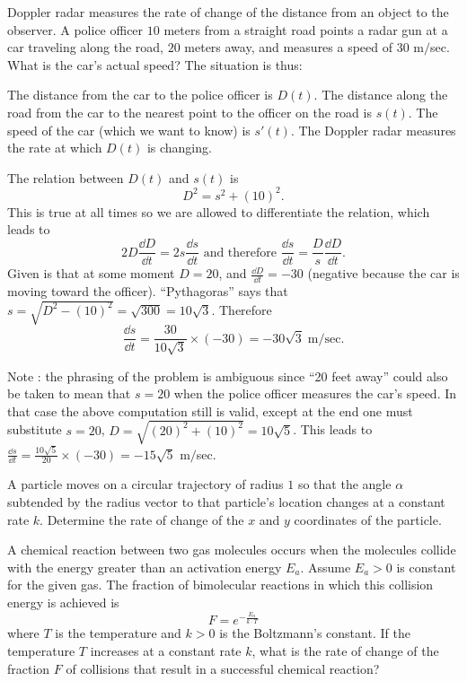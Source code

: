 \begin{multicols}{2}
\problem Doppler radar measures the rate of change of the distance from an
object to the observer. A police officer $10$ meters from a straight road points
a radar gun at a car traveling along the road, $20$ meters away, and measures a
speed of $30$ m$/$sec. What is the car's actual speed?
\answer
The situation is thus:
\begin{center}
  
\end{center}
The distance from the car to the police officer is $D(t)$.
The distance along the road from the car to the nearest point to the officer
on the road is $s(t)$.  The speed of the car (which we want to know) is $s'(t)$.
The Doppler radar measures the rate at which $D(t)$ is changing.

The relation between $D(t)$ and $s(t)$ is
\[
D^2 = s^2 + (10)^2.
\]
This is true at all times so we are allowed to differentiate the relation,
which leads to
\[
2D \frac{\dd D} {\dd t} = 2s\frac{\dd s} {\dd t}
\text{ and therefore }
\frac{\dd s} {\dd t} = \frac{D} {s} \frac{\dd D} {\dd t}.
\]
Given is that at some moment $D=20$, and $\frac{\dd D} {\dd t} = -30$
(negative because the car is moving toward the officer).
``Pythagoras'' says that $s = \sqrt{D^2-(10)^2} = \sqrt{300} = 10\surd 3$.
Therefore
\[
\frac{\dd s} {\dd t} = \frac{30} {10\surd 3} \times(-30) =
-30\surd 3\; \mathrm{m}/\mathrm{sec}.
\]

Note : the phrasing of the problem is ambiguous since ``20 feet away'' could
also be taken to mean that $s=20$ when the police officer measures the car's
speed. In that case the above computation still is valid, except at the end
one must substitute $s=20$, $D = \sqrt{(20)^2 + (10)^2} = 10\surd 5$.
This leads to
$\frac{\dd s} {\dd t} = \frac{10\surd 5} {20}\times(-30) = -15\surd 5$ m$/$sec.
\endanswer

\problem A particle moves on a circular trajectory of radius $1$ so that the
angle $\alpha$ subtended by the radius vector to that particle's location
changes at a constant rate $k$.  Determine the rate of change of the $x$ and
$y$ coordinates of the particle.

\problem A chemical reaction between two gas molecules occurs when the molecules
collide with the energy greater than an activation energy $E_a$. Assume $E_a>0$
is constant for the given gas. The fraction of bimolecular reactions in which
this collision energy is achieved is
\[
  F=e^{-\frac{E_a}{k \cdot T}}
\]
where $T$ is the temperature and $k>0$ is the Boltzmann's constant. If the
temperature $T$ increases at a constant rate $k$, what is the rate of change of
the fraction $F$ of collisions that result in a successful chemical reaction?


\end{multicols}
